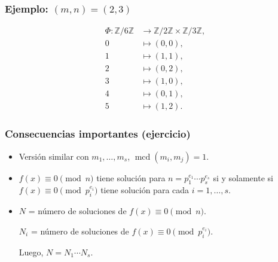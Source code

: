 \documentclass[handout]{beamer}
\newcommand{\ZZ}{\mathbb{Z}}
\DeclareMathOperator{\mcd}{mcd}
\begin{document}

\begin{frame}
  \frametitle{Ejemplo: $(m,n) = (2,3)$}

  \begin{align*}
    \Phi\colon \ZZ/6\ZZ & \to \ZZ/2\ZZ \times \ZZ/3\ZZ, \\
    0 & \mapsto (0,0), \\
    1 & \mapsto (1,1), \\
    2 & \mapsto (0,2), \\
    3 & \mapsto (1,0), \\
    4 & \mapsto (0,1), \\
    5 & \mapsto (1,2).
  \end{align*}
\end{frame}


\begin{frame}
  \frametitle{Consecuencias importantes (ejercicio)}

  \begin{itemize}
  \item<2-> Versión similar con $m_1, \ldots, m_s$, $\mcd (m_i,m_j) = 1$.

  \item<3-> $f (x) \equiv 0 \pmod{n}$ tiene
    solución para $n = p_1^{e_1} \cdots p_s^{e_s}$ si y solamente si
    $f (x) \equiv 0 \pmod{p_i^{e_i}}$ tiene solución para cada $i = 1,\ldots,s$.

  \item<4-> $N$ = número de soluciones de $f (x) \equiv 0 \pmod{n}$.

    $N_i$ = número de soluciones de $f (x) \equiv 0 \pmod{p_i^{e_i}}$.

    Luego, $N = N_1 \cdots N_s$.
  \end{itemize}
\end{frame}

\end{document}
